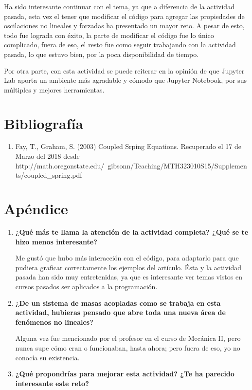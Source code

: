 \documentclass[a4paper]{article}
\begin{document}
\begin{center}
Ha sido interesante continuar con el tema, ya que a diferencia de la actividad pasada, esta vez el tener que modificar el código para agregar las propiedades de oscilaciones no lineales y forzadas ha presentado un mayor reto. A pesar de esto, todo fue lograda con éxito, la parte de modificar el código fue lo único complicado, fuera de eso, el resto fue como seguir trabajando con la actividad pasada, lo que estuvo bien, por la poca disponibilidad de tiempo.  


Por otra parte, con esta actividad se puede reiterar en la opinión de que Jupyter Lab aporta un ambiente más agradable y cómodo que Jupyter Notebook, por sus múltiples y mejores herramientas.

\section{Bibliografía}
\begin{enumerate}
\item Fay, T., Graham, S. (2003) Coupled Srping Equations. Recuperado el 17 de Marzo del 2018 desde http://math.oregonstate.edu/~gibsonn/Teaching/MTH323\-010S15/Supplements/coupled\_spring.pdf

\end{enumerate}

\section{Apéndice}
\begin{enumerate}
\item \textbf{¿Qué más te llama la atención de la actividad completa? ¿Qué se te hizo menos interesante?}

Me gustó que hubo más interacción con el código, para adaptarlo para que pudiera graficar correctamente los ejemplos del artículo. Ésta y la actividad pasada han sido muy entretenidas, ya que es interesante ver temas vistos en cursos pasados ser aplicados a la programación.

\item \textbf{¿De un sistema de masas acopladas como se trabaja en esta actividad, hubieras pensado que abre toda una nueva área de fenómenos no lineales?}

Alguna vez fue mencionado por el profesor en el curso de Mecánica II, pero nunca supe cómo eran o funcionaban, hasta ahora; pero fuera de eso, yo no conocía su existencia. 

\item \textbf{¿Qué propondrías para mejorar esta actividad? ¿Te ha parecido interesante este reto?} 


\end{enumerate}
\end{center}
\end{document}
